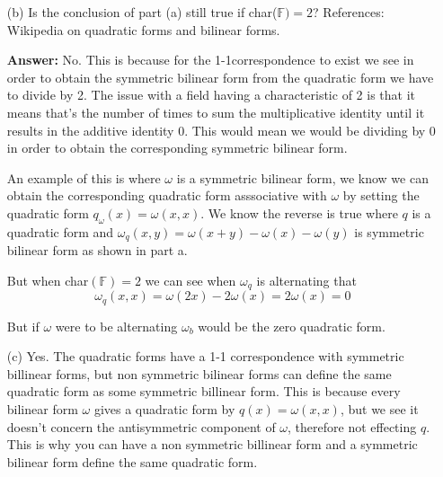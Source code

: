 \documentclass[12pt]{article}
\newcommand      {\Fm}          {{\mathbb F}}
\begin{document}
\begin{itemize}
\begin{itemize}
\begin{proof}
            Recall though that $\omega$ was defined as a symmetric bilinear form, therefore $b_\omega$ is a symmetric bilinear form.
            
            Now for the converse, let $\omega(x) = (x,x)$ be a quadratic function,
            \begin{align*}
                b_\omega(x,x) &= \omega(x+x) - \omega(x) - \omega(x) \\
                &= (x+x, x+x) - (x,x) - (x,x) \\
                &= 4(x,x) - 2(x,x) \\
                &= 2(x,x) \\
                \frac{1}{2}b_\omega(x) &= (x,x)
            \end{align*}
        \end{proof}

        Thus we see $\frac{1}{2}b_\omega(x,x)$ is the bilinear form determined by the quadratic form $\omega(x) = (x,x)$

        \item[(b)] Is the conclusion of part (a) still true if char($\Fm)=2$?
        References: Wikipedia on quadratic forms and bilinear forms. 

        \textbf{Answer:} No. This is because for the 1-1correspondence to exist we see in order to obtain the symmetric bilinear form from the quadratic form we have to divide by 2. The issue with a field having a characteristic of 2 is that it means that's the number of times to sum the multiplicative identity until it results in the additive identity 0. This would mean we would be dividing by 0 in order to obtain the corresponding symmetric bilinear form. 

        An example of this is where $\omega$ is a symmetric bilinear form, we know we can obtain the corresponding quadratic form asssociative with $\omega$ by setting the quadratic form $q_\omega(x) = \omega(x,x)$. We know the reverse is true where $q$ is a quadratic form and $\omega_q(x,y) = \omega(x+y) - \omega(x) -\omega(y)$ is symmetric bilinear form as shown in part a.  

        But when char$(\Fm) = 2$ we can see when $\omega_q$ is alternating that \[\omega_q(x,x) = \omega(2x)-2\omega(x) = 2\omega(x) = 0\]

        But if $\omega$ were to be alternating $\omega_b$ would be the zero quadratic form. 


        
        \item[(c)] Yes. The quadratic forms have a 1-1 correspondence with symmetric billinear forms, but non symmetric bilinear forms can define the same quadratic form as some symmetric billinear form. This is because every bilinear form $\omega$ gives a quadratic form by $q(x) = \omega(x,x)$, but we see it doesn't concern the antisymmetric component of $\omega$, therefore not effecting $q$. This is why you can have a non symmetric billinear form and a symmetric bilinear form define the same quadratic form. 
    \end{itemize}
    
\end{itemize}
\end{document}
